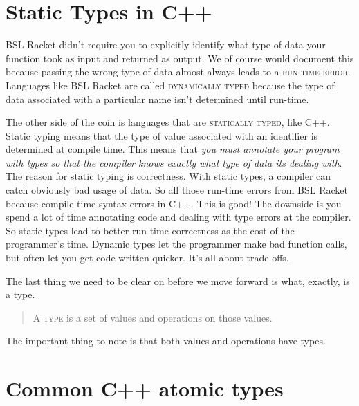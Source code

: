 \documentclass[]{tufte-handout}
\begin{document}
\section{Static Types in C++}

BSL Racket didn't require you to explicitly identify what type of data your function took as input and returned as output.  We of course would document this because passing the wrong type of data almost always leads to a \textsc{run-time error}. Languages like BSL Racket are called \textsc{dynamically typed} because the type of data associated with a particular name isn't determined until run-time.  

The other side of the coin is languages that are \textsc{statically typed}, like C++.  Static typing means that the type of value associated with an identifier is determined at compile time.  This means that \textit{you must annotate your program with types so that the compiler knows exactly what type of data its dealing with}. The reason for static typing is correctness.  With static types, a compiler can catch obviously bad usage of data. So all those run-time errors from BSL Racket because compile-time syntax errors in C++.  This is good! The downside is you spend a lot of time annotating code and dealing with type errors at the compiler. So static types lead to better run-time correctness as the cost of the programmer's time. Dynamic types let the programmer make bad function calls, but often let you get code written quicker. It's all about trade-offs.   

The last thing we need to be clear on before we move forward is what, exactly, is a type.  
\begin{quote}
A \textsc{type} is a set of values and operations on those values.  
\end{quote}
The important thing to note is that both values and operations have types. 

\section{Common C++ atomic types}
\end{document}
